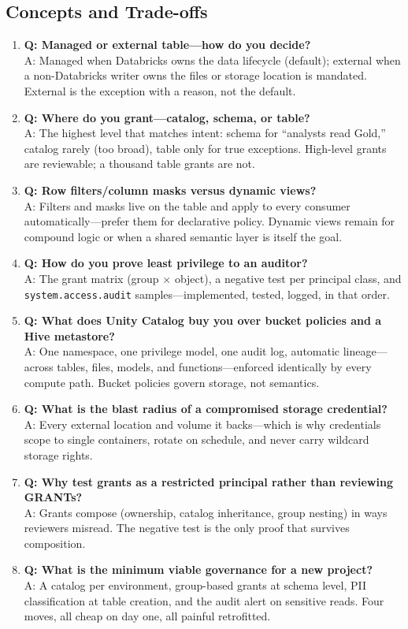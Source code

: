 \subsection{Concepts and Trade-offs}
\begin{enumerate}
    \item \textbf{Q: Managed or external table---how do you decide?}\\
    A: Managed when Databricks owns the data lifecycle (default); external when a non-Databricks writer owns the files or storage location is mandated. External is the exception with a reason, not the default.
    \item \textbf{Q: Where do you grant---catalog, schema, or table?}\\
    A: The highest level that matches intent: schema for ``analysts read Gold,'' catalog rarely (too broad), table only for true exceptions. High-level grants are reviewable; a thousand table grants are not.
    \item \textbf{Q: Row filters/column masks versus dynamic views?}\\
    A: Filters and masks live on the table and apply to every consumer automatically---prefer them for declarative policy. Dynamic views remain for compound logic or when a shared semantic layer is itself the goal.
    \item \textbf{Q: How do you prove least privilege to an auditor?}\\
    A: The grant matrix (group $\times$ object), a negative test per principal class, and \texttt{system.access.audit} samples---implemented, tested, logged, in that order.
    \item \textbf{Q: What does Unity Catalog buy you over bucket policies and a Hive metastore?}\\
    A: One namespace, one privilege model, one audit log, automatic lineage---across tables, files, models, and functions---enforced identically by every compute path. Bucket policies govern storage, not semantics.
    \item \textbf{Q: What is the blast radius of a compromised storage credential?}\\
    A: Every external location and volume it backs---which is why credentials scope to single containers, rotate on schedule, and never carry wildcard storage rights.
    \item \textbf{Q: Why test grants as a restricted principal rather than reviewing GRANTs?}\\
    A: Grants compose (ownership, catalog inheritance, group nesting) in ways reviewers misread. The negative test is the only proof that survives composition.
    \item \textbf{Q: What is the minimum viable governance for a new project?}\\
    A: A catalog per environment, group-based grants at schema level, PII classification at table creation, and the audit alert on sensitive reads. Four moves, all cheap on day one, all painful retrofitted.
\end{enumerate}

